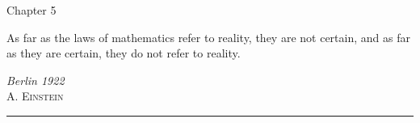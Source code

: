 \begin{titlepage}
\noindent
\titlefont Chapter 5\par
\epigraph{As far as the laws of mathematics refer to reality, they are not certain, 	  and as far as they are certain, they do not refer to reality.}%
{\textit{Berlin 1922}\\ \textsc{A. Einstein}}
\null\vfill
\vspace*{1cm}
\noindent
\hfill
\begin{minipage}{0.35\linewidth}
    \begin{flushright}
        \printauthor
    \end{flushright}
\end{minipage}
%
\begin{minipage}{0.02\linewidth}
    \rule{1pt}{60pt}
\end{minipage}
\titlepagedecoration

\end{titlepage}
